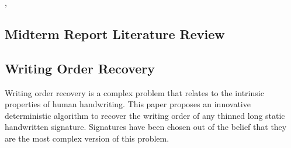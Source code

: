 \documentclass[10pt,twocolumn,letterpaper]{article}
\begin{document}

,\vspace*{-1em}

\subsection*{Midterm Report Literature Review}
\subsection{Writing Order Recovery\cite{WOR}}
Writing order recovery is a complex problem that relates to the intrinsic properties of human handwriting. This paper \cite{WOR} proposes an innovative deterministic algorithm to recover the writing order of any thinned long static handwritten signature. Signatures have been chosen out of the belief that they are the most complex version of this problem.
\end{document}
